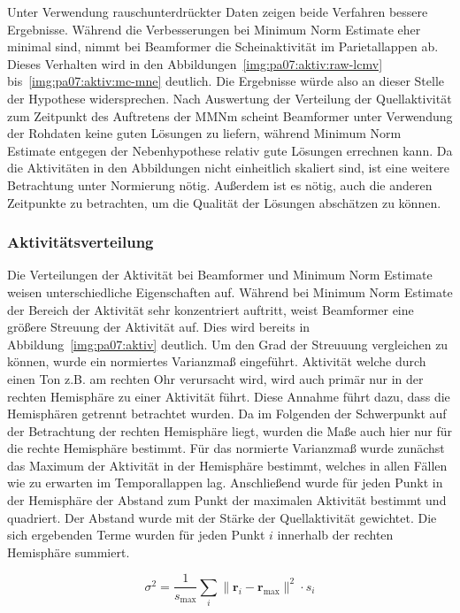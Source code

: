 \documentclass[doc,a4paper,12pt]{apa6}
\newcommand{\mx}[1]{\mathbf{#1}}
\begin{document}
Unter Verwendung rauschunterdrückter Daten zeigen beide Verfahren bessere Ergebnisse. Während die Verbesserungen bei Minimum Norm Estimate eher minimal sind, nimmt bei Beamformer die Scheinaktivität im Parietallappen ab. Dieses Verhalten wird in den Abbildungen~\ref{img:pa07:aktiv:raw-lcmv} bis~\ref{img:pa07:aktiv:mc-mne} deutlich. Die Ergebnisse würde also an dieser Stelle der Hypothese widersprechen. Nach Auswertung der Verteilung der Quellaktivität zum Zeitpunkt des Auftretens der MMNm scheint Beamformer unter Verwendung der Rohdaten keine guten Lösungen zu liefern, während Minimum Norm Estimate entgegen der Nebenhypothese relativ gute Lösungen errechnen kann. Da die Aktivitäten in den Abbildungen nicht einheitlich skaliert sind, ist eine weitere Betrachtung unter Normierung nötig. Außerdem ist es nötig, auch die anderen Zeitpunkte zu betrachten, um die Qualität der Lösungen abschätzen zu können.

\subsubsection{Aktivitätsverteilung}
\label{sec:akti-verteilung}

Die Verteilungen der Aktivität bei Beamformer und Minimum Norm Estimate weisen unterschiedliche Eigenschaften auf. Während bei Minimum Norm Estimate der Bereich der Aktivität sehr konzentriert auftritt, weist Beamformer eine größere Streuung der Aktivität auf. Dies wird bereits in Abbildung~\ref{img:pa07:aktiv} deutlich. Um den Grad der Streuuung vergleichen zu können, wurde ein normiertes Varianzmaß eingeführt. Aktivität welche durch einen Ton z.B. am rechten Ohr verursacht wird, wird auch primär nur in der rechten Hemisphäre zu einer Aktivität führt. Diese Annahme führt dazu, dass die Hemisphären getrennt betrachtet wurden. Da im Folgenden der Schwerpunkt auf der Betrachtung der rechten Hemisphäre liegt, wurden die Maße auch hier nur für die rechte Hemisphäre bestimmt. Für das normierte Varianzmaß wurde zunächst das Maximum der Aktivität in der Hemisphäre bestimmt, welches in allen Fällen wie zu erwarten im Temporallappen lag. Anschließend wurde für jeden Punkt in der Hemisphäre der Abstand zum Punkt der maximalen Aktivität bestimmt und quadriert. Der Abstand wurde mit der Stärke der Quellaktivität gewichtet. Die sich ergebenden Terme wurden für jeden Punkt $i$ innerhalb der rechten Hemisphäre summiert.

\begin{equation}
\sigma^2 = \frac{1}{s_{\text{max}}} \sum_i \|\mx{r}_i - \mx{r}_{\text{max}}\|^2 \cdot s_i
\end{equation}
\end{document}
